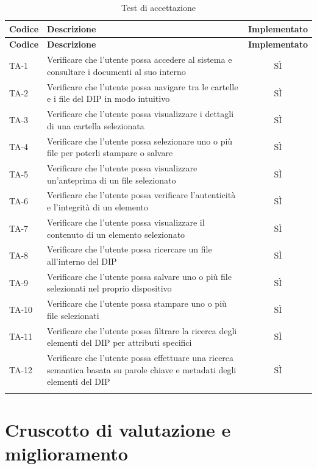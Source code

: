 \documentclass[a4paper,12pt]{article}
\begin{document}
\setlength{\LTleft}{0.9cm}
\renewcommand{\arraystretch}{1.2}
\begin{longtable}{|p{1.5cm}|p{8.5cm}|c|}
\hline
\rowcolor{zpusgreen!30}
\textbf{Codice} & \textbf{Descrizione} & \textbf{Implementato} \\
\hline
\endfirsthead
\rowcolor{zpusgreen!30}
\textbf{Codice} & \textbf{Descrizione} & \textbf{Implementato} \\
\hline
\endhead
TA-1 & Verificare che l'utente possa accedere al sistema e consultare i documenti al suo interno & SÌ \\
\hline
TA-2 & Verificare che l'utente possa navigare tra le cartelle e i file del DIP in modo intuitivo & SÌ \\
\hline
TA-3 & Verificare che l'utente possa visualizzare i dettagli di una cartella selezionata & SÌ \\
\hline
TA-4 & Verificare che l'utente possa selezionare uno o più file per poterli stampare o salvare & SÌ \\
\hline
TA-5 & Verificare che l'utente possa visualizzare un'anteprima di un file selezionato & SÌ \\
\hline
TA-6 & Verificare che l'utente possa verificare l'autenticità e l'integrità di un elemento & SÌ \\
\hline
TA-7 & Verificare che l'utente possa visualizzare il contenuto di un elemento selezionato & SÌ \\
\hline
TA-8 & Verificare che l'utente possa ricercare un file all'interno del DIP & SÌ \\
\hline
TA-9 & Verificare che l'utente possa salvare uno o più file selezionati nel proprio dispositivo & SÌ \\
\hline
TA-10 & Verificare che l'utente possa stampare uno o più file selezionati & SÌ \\
\hline
TA-11 & Verificare che l'utente possa filtrare la ricerca degli elementi del DIP per attributi specifici & SÌ \\
\hline
TA-12 & Verificare che l'utente possa effettuare una ricerca semantica basata su parole chiave e metadati degli elementi del DIP & SÌ \\
\hline
\rowcolor{white}
\caption{Test di accettazione}
\label{tab:test-accettazione}
\end{longtable}

\section{Cruscotto di valutazione e miglioramento}
\end{document}
